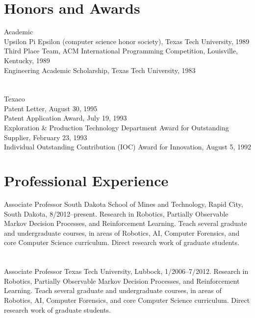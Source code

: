 \documentclass[12pt]{resume}
\begin{document}
\section{Honors and Awards}  
{Academic}   
{\\
Upsilon Pi Epsilon (computer science honor society), Texas Tech University,
1989\\
Third Place Team, ACM International Programming Competition,
Louisville, Kentucky,  1989\\
Engineering Academic Scholarship, Texas Tech University, 1983}

\section{}
{Texaco}   
{\\Patent Letter, August 30, 1995\\
Patent Application Award, July 19, 1993 \\
Exploration \& Production Technology Department Award for 
Outstanding Supplier, February 23, 1993  \\
Individual Outstanding Contribution (IOC) Award for Innovation,
August 5, 1992}


\section{Professional Experience}
{Associate Professor} {South Dakota School of Mines and Technology,
Rapid City, South Dakota, 8/2012--present.
Research in Robotics, Partially Observable Markov Decision Processes, and
Reinforcement Learning.  Teach several graduate and undergraduate courses,
in areas of Robotics, AI, Computer Forensics, and core Computer Science
curriculum.  Direct research work of graduate
students.}

\section{}
{Associate Professor} {Texas Tech University, Lubbock, 1/2006--7/2012.
Research in Robotics, Partially Observable Markov Decision Processes, and
Reinforcement Learning.  Teach several graduate and undergraduate courses,
in areas of Robotics, AI, Computer Forensics, and core Computer Science
curriculum.  Direct research work of graduate
students.}
\end{document}
